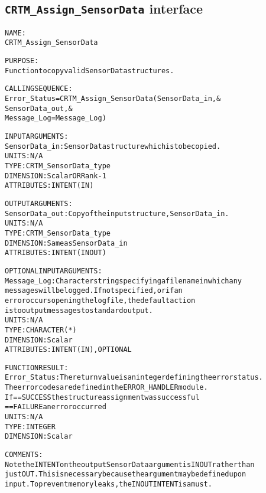 \subsection{\texttt{CRTM\_Assign\_SensorData} interface}
  \label{sec:CRTM_Assign_SensorData_interface}
  \begin{alltt}
 
  NAME:
        CRTM_Assign_SensorData
 
  PURPOSE:
        Function to copy valid SensorData structures.
 
  CALLING SEQUENCE:
        Error_Status = CRTM_Assign_SensorData( SensorData_in          , &
                                               SensorData_out         , &
                                               Message_Log=Message_Log  )
 
  INPUT ARGUMENTS:
        SensorData_in:   SensorData structure which is to be copied.
                         UNITS:      N/A
                         TYPE:       CRTM_SensorData_type
                         DIMENSION:  Scalar OR Rank-1
                         ATTRIBUTES: INTENT(IN)
 
  OUTPUT ARGUMENTS:
        SensorData_out:  Copy of the input structure, SensorData_in.
                         UNITS:      N/A
                         TYPE:       CRTM_SensorData_type
                         DIMENSION:  Same as SensorData_in
                         ATTRIBUTES: INTENT(IN OUT)
 
  OPTIONAL INPUT ARGUMENTS:
        Message_Log:     Character string specifying a filename in which any
                         messages will be logged. If not specified, or if an
                         error occurs opening the log file, the default action
                         is to output messages to standard output.
                         UNITS:      N/A
                         TYPE:       CHARACTER(*)
                         DIMENSION:  Scalar
                         ATTRIBUTES: INTENT(IN), OPTIONAL
 
  FUNCTION RESULT:
        Error_Status:    The return value is an integer defining the error status.
                         The error codes are defined in the ERROR_HANDLER module.
                         If == SUCCESS the structure assignment was successful
                            == FAILURE an error occurred
                         UNITS:      N/A
                         TYPE:       INTEGER
                         DIMENSION:  Scalar
 
  COMMENTS:
        Note the INTENT on the output SensorData argument is IN OUT rather than
        just OUT. This is necessary because the argument may be defined upon
        input. To prevent memory leaks, the IN OUT INTENT is a must.
 
  \end{alltt}
